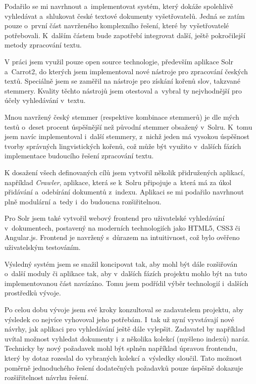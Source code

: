 \begin{conclusion}
Podařilo se mi navrhnout a~implementovat systém, který dokáže spolehlivě vyhledávat a~shlukovat české textové dokumenty vyšetřovatelů. Jedná se zatím pouze o~první část navrženého komplexního řešení, které by vyšetřovatelé potřebovali. K~dalším částem bude zapotřebí integrovat další, ještě pokročilejší metody zpracování textu.

V práci jsem využil pouze open source technologie, především aplikace Solr a~Carrot2, do kterých jsem implementoval nové nástroje pro zpracování českých textů. Speciálně jsem se zaměřil na nástroje pro získání kořenů slov, takzvané stemmery. Kvality těchto nástrojů jsem otestoval a~vybral ty nejvhodnější pro účely vyhledávání v~textu. 

Mnou navržený český stemmer (respektive kombinace stemmerů) je dle mých testů o~deset procent úspěšnější než původní stemmer obsažený v~Solru. K~tomu jsem navíc implementoval i~další stemmery, z~nichž jeden má vysokou úspěšnost tvorby správných lingvistických kořenů, což může být využito v~dalších fázích implementace budoucího řešení zpracování textu.

K dosažení všech definovaných cílů jsem vytvořil několik přidružených aplikací, například \emph{Crawler}, aplikace, která se k~Solru připojuje a~která má za úkol přidávání a~odebírání dokumentů z~indexu. Aplikaci se mi podařilo navrhnout plně modulární a~tedy i~do budoucna rozšiřitelnou.

Pro Solr jsem také vytvořil webový frontend pro uživatelské vyhledávání v~dokumentech, postavený na moderních technologiích jako HTML5, CSS3 či Angular.js. Frontend je navržený s~důrazem na intuitivnost, což bylo ověřeno uživatelským testováním.

Výsledný systém jsem se snažil koncipovat tak, aby mohl být dále rozšiřován o~další moduly či aplikace tak, aby v~dalších fázích projektu mohlo být na tuto implementovanou část navázáno. Tomu jsem podřídil výběr technologií i~dalších prostředků vývoje.

Po celou dobu vývoje jsem své kroky konzultoval se zadavatelem projektu, aby výsledek co nejvíce vyhovoval jeho potřebám. I~tak už nyní vyvstávají nové návrhy, jak aplikaci pro vyhledávání ještě dále vylepšit. Zadavatel by například uvítal možnost vyhledat dokumenty i~z několika kolekcí (myšleno indexů) naráz. Technicky by nový požadavek mohl být splněn například úpravou frontendu, který by dotaz rozeslal do vybraných kolekcí a~výsledky sloučil. Tato možnost poměrně jednoduchého řešení dodatečných požadavků pouze úspěšně dokazuje rozšiřitelnost návrhu řešení.
\end{conclusion}